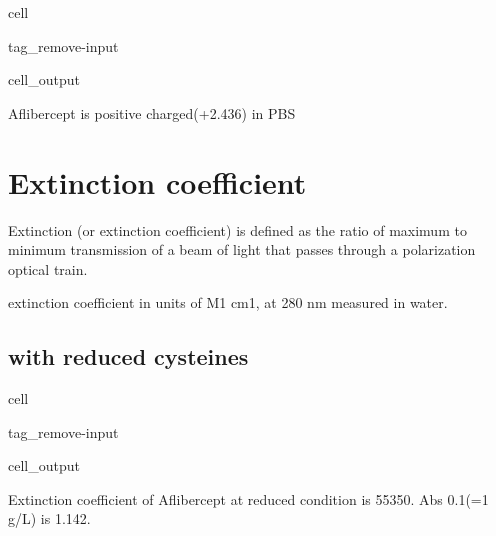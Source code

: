 \documentclass[letterpaper,10pt,english]{jupyterBook}
\begin{document}
\begin{sphinxuseclass}{cell}
\begin{sphinxuseclass}{tag_remove-input}\begin{sphinxVerbatimOutput}

\begin{sphinxuseclass}{cell_output}
\begin{sphinxVerbatim}[commandchars=\\\{\}]
Aflibercept is positive charged(+2.436) in PBS
\end{sphinxVerbatim}

\end{sphinxuseclass}\end{sphinxVerbatimOutput}

\end{sphinxuseclass}
\end{sphinxuseclass}

\section{Extinction coefficient}
\label{\detokenize{ipynb/chapter1:extinction-coefficient}}
\sphinxAtStartPar
Extinction (or extinction coefficient) is defined as the ratio of maximum to minimum transmission of a beam of light that passes through a polarization optical train.

\sphinxAtStartPar
extinction coefficient in units of  M\sphinxhyphen{}1 cm\sphinxhyphen{}1, at 280 nm measured in water.


\subsection{with reduced cysteines}
\label{\detokenize{ipynb/chapter1:with-reduced-cysteines}}
\begin{sphinxuseclass}{cell}
\begin{sphinxuseclass}{tag_remove-input}\begin{sphinxVerbatimOutput}

\begin{sphinxuseclass}{cell_output}
\begin{sphinxVerbatim}[commandchars=\\\{\}]
Extinction coefficient of Aflibercept at reduced condition is 55350.
Abs 0.1\PYGZpc{}(=1 g/L) is 1.142.
\end{sphinxVerbatim}

\end{sphinxuseclass}\end{sphinxVerbatimOutput}

\end{sphinxuseclass}
\end{sphinxuseclass}
\end{document}
